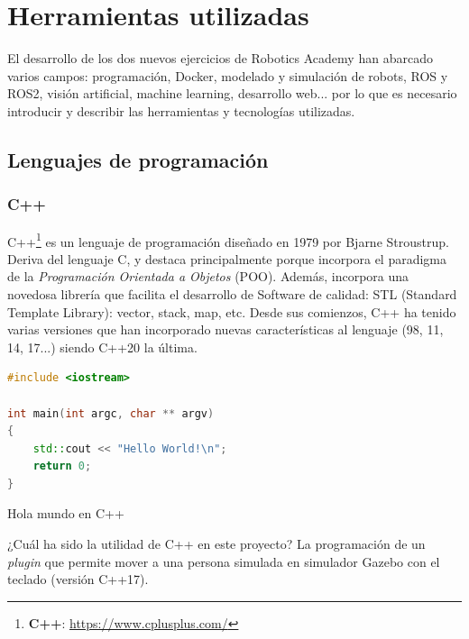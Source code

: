 \chapter{Herramientas utilizadas}
\label{cap:capitulo3}

El desarrollo de los dos nuevos ejercicios de Robotics Academy han abarcado varios campos: programación, Docker, modelado y simulación de robots, ROS y ROS2, visión artificial, machine learning, desarrollo web... por lo que es necesario introducir y describir las herramientas y tecnologías utilizadas.\\



\section{Lenguajes de programación}
\label{sec:lenguajes_programacion}


\subsection{C++}
\label{subsec:c++}

C++\footnote{\textbf{C++}: \url{https://www.cplusplus.com/}} es un lenguaje de programación diseñado en 1979 por Bjarne Stroustrup. Deriva del lenguaje C, y destaca principalmente porque incorpora el paradigma de la \textit{Programación Orientada a Objetos} (POO). Además, incorpora una novedosa librería que facilita el desarrollo de Software de calidad: STL (Standard Template Library): vector, stack, map, etc. Desde sus comienzos, C++ ha tenido varias versiones que han incorporado nuevas características al lenguaje (98, 11, 14, 17...) siendo C++20 la última.\\

\begin{code}[H]
\begin{lstlisting}[language=C++]
#include <iostream>

int main(int argc, char ** argv)
{
	std::cout << "Hello World!\n";
	return 0;
}
\end{lstlisting}
\caption[Hola mundo en C++]{Hola mundo en C++}
\label{cod:holamundo_cplusplus}
\end{code}

¿Cuál ha sido la utilidad de C++ en este proyecto? La programación de un \textit{plugin} que permite mover a una persona simulada en simulador Gazebo con el teclado (versión C++17).\\




